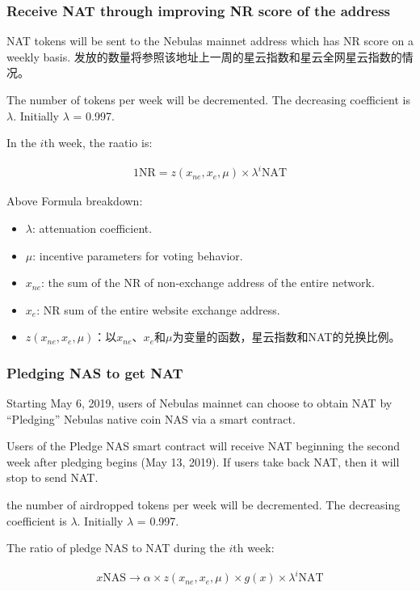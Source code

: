 \subsubsection{Receive NAT through improving NR score of the address}

NAT tokens will be sent to the Nebulas mainnet address which has NR score on a weekly basis. 发放的数量将参照该地址上一周的星云指数和星云全网星云指数的情况。

The number of tokens per week will be decremented. The decreasing coefficient is $\lambda$. Initially $\lambda$ = 0.997.

In the $i$th week, the raatio is:

\begin{align}
1 \text{NR}=z(x_{ne},x_{e},\mu)\times\lambda^{i} \text{NAT}
\end{align} 

Above Formula breakdown:

\begin{itemize}
	\item $\lambda$: attenuation coefficient.
	\item $\mu$: incentive parameters for voting behavior.
	\item $x_{ne}$: the sum of the NR of non-exchange address of the entire network.
	\item $x_{e}$: NR sum of the entire website exchange address.
	\item $z(x_{ne},x_{e},\mu)$：以$x_{ne}$、$x_{e}$和$\mu$为变量的函数，星云指数和NAT的兑换比例。
\end{itemize}

\subsubsection{Pledging NAS to get NAT}

Starting May 6, 2019, users of Nebulas mainnet can choose to obtain NAT by “Pledging” Nebulas native coin NAS via a smart contract.

Users of the Pledge NAS smart contract will receive NAT beginning the second week after pledging begins (May 13, 2019). If users take back NAT, then it will stop to send NAT.

the number of airdropped tokens per week will be decremented. The decreasing coefficient is $\lambda$. Initially $\lambda$ = 0.997.

The ratio of pledge NAS to NAT during the $i$th week:

\begin{align}
x \text{NAS} \rightarrow \alpha \times z(x_{ne},x_{e},\mu)\times g(x) \times \lambda^{i} \text{NAT}
\end{align}


